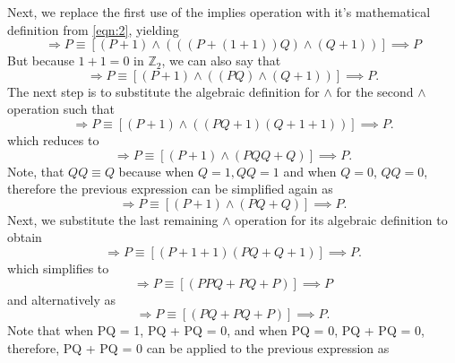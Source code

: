 \documentclass{article}
\begin{document}
Next, we replace the first use of the implies operation with it's mathematical definition from \eqref{eqn:2}, yielding 
\begin{equation*}
[\neg P \wedge ((\neg P \Longrightarrow Q) \wedge \neg Q)] \Longrightarrow P \equiv[(P + 1)\wedge (((P + (1 + 1))Q)\wedge (Q+1))]\implies P
\end{equation*}
But because $1 + 1 = 0$ in $\mathbb{Z}_2$, we can also say that
\begin{equation*}
[\neg P \wedge ((\neg P \Longrightarrow Q) \wedge \neg Q)] \Longrightarrow P \equiv[(P + 1)\wedge ((PQ) \wedge (Q+1))]\implies P.
\end{equation*}
The next step is to substitute the algebraic definition for $\wedge$ for the second $\wedge$ operation such that
\begin{equation*}
[\neg P \wedge ((\neg P \Longrightarrow Q) \wedge \neg Q)] \Longrightarrow P \equiv[(P + 1)\wedge ((PQ + 1)(Q+1+1))]\implies P.
\end{equation*}
which reduces to
\begin{equation*}
[\neg P \wedge ((\neg P \Longrightarrow Q) \wedge \neg Q)] \Longrightarrow P \equiv[(P + 1)\wedge (PQQ + Q)]\implies P.
\end{equation*}
Note, that $QQ \equiv Q$ because when $Q = 1, QQ = 1$ and when $Q = 0$, $QQ = 0$, therefore the previous expression can be simplified again as
\begin{equation*}
[\neg P \wedge ((\neg P \Longrightarrow Q) \wedge \neg Q)] \Longrightarrow P \equiv[(P + 1)\wedge (PQ + Q)]\implies P.
\end{equation*}
Next, we substitute the last remaining $\wedge$ operation for its algebraic definition to obtain
\begin{equation*}
[\neg P \wedge ((\neg P \Longrightarrow Q) \wedge \neg Q)] \Longrightarrow P \equiv[(P + 1 + 1)(PQ + Q + 1)]\implies P.
\end{equation*}
which simplifies to
\begin{equation*}
[\neg P \wedge ((\neg P \Longrightarrow Q) \wedge \neg Q)] \Longrightarrow P \equiv[(PPQ + PQ + P)]\implies P
\end{equation*}
and alternatively as 
\begin{equation*}
[\neg P \wedge ((\neg P \Longrightarrow Q) \wedge \neg Q)] \Longrightarrow P \equiv[(PQ + PQ + P)]\implies P.
\end{equation*}
Note that when PQ = 1, PQ + PQ = 0, and when PQ = 0, PQ + PQ = 0, therefore, PQ + PQ = 0 can be applied to the previous expression as
\end{document}

